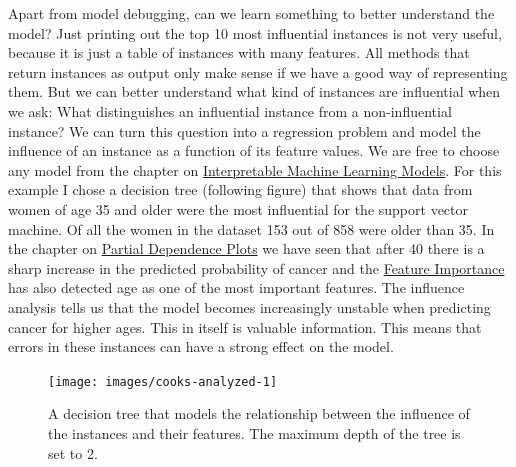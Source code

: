 \documentclass[12pt,]{krantz}
\begin{document}
Apart from model debugging, can we learn something to better understand
the model? Just printing out the top 10 most influential instances is
not very useful, because it is just a table of instances with many
features. All methods that return instances as output only make sense if
we have a good way of representing them. But we can better understand
what kind of instances are influential when we ask: What distinguishes
an influential instance from a non-influential instance? We can turn
this question into a regression problem and model the influence of an
instance as a function of its feature values. We are free to choose any
model from the chapter on \protect\hyperlink{simple}{Interpretable
Machine Learning Models}. For this example I chose a decision tree
(following figure) that shows that data from women of age 35 and older
were the most influential for the support vector machine. Of all the
women in the dataset 153 out of 858 were older than 35. In the chapter
on \protect\hyperlink{pdp}{Partial Dependence Plots} we have seen that
after 40 there is a sharp increase in the predicted probability of
cancer and the \protect\hyperlink{feature-importance}{Feature
Importance} has also detected age as one of the most important features.
The influence analysis tells us that the model becomes increasingly
unstable when predicting cancer for higher ages. This in itself is
valuable information. This means that errors in these instances can have
a strong effect on the model.

\begin{figure}

{\centering \texttt{[image: images/cooks-analyzed-1]} 

}

\caption{A decision tree that models the relationship between the influence of the instances and their features. The maximum depth of the tree is set to 2.}\label{fig:cooks-analyzed-include}
\end{figure}
\end{document}
